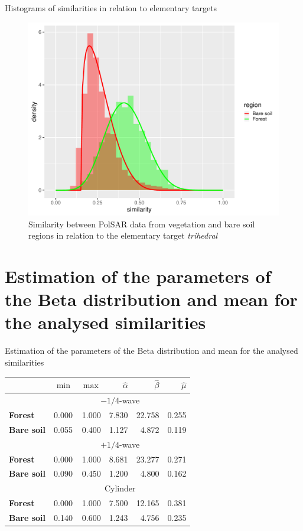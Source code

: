 \documentclass[10pt]{beamer}
\begin{document}
\begin{frame}[fragile]{Histograms of similarities in relation to elementary targets}

\begin{figure}
    \centering
    \includegraphics[width = .6\linewidth]{tr.pdf}
    \caption{Similarity between PolSAR data from vegetation and bare soil regions in relation to the elementary target \textit{trihedral}}
    \label{fig:tr}
\end{figure}
    
\end{frame}

\section[Estimation parameters]{Estimation of the parameters of the Beta distribution and mean for the analysed similarities}

\begin{frame}[fragile]{Estimation of the parameters of the Beta distribution and mean for the analysed similarities}
    \begin{table}[hbt]
    \centering
    \begin{tabular}{lrrrrr}
    \toprule
    & $\min$ & $\max$ & $\widehat\alpha$ & $\widehat\beta$ & $\widehat\mu$\\ \midrule
    & \multicolumn{5}{c}{$-1/4$-wave}\\
    \cmidrule(lr){2-6}
    \textbf{Forest} & 0.000 & 1.000 & 7.830 & 22.758 & 0.255\\
    \textbf{Bare soil} & 0.055 & 0.400 & 1.127 & 4.872 & 0.119\\
    \midrule
    & \multicolumn{5}{c}{$+1/4$-wave}\\
    \cmidrule(lr){2-6}
    \textbf{Forest} & 0.000 & 1.000 & 8.681 & 23.277 & 0.271\\
    \textbf{Bare soil} & 0.090 & 0.450 & 1.200 & 4.800 & 0.162\\
    \midrule
    & \multicolumn{5}{c}{Cylinder}\\
    \cmidrule(lr){2-6}
    \textbf{Forest} & 0.000 & 1.000 & 7.500 & 12.165 & 0.381\\
    \textbf{Bare soil} & 0.140 & 0.600 & 1.243 & 4.756 & 0.235\\
    \bottomrule
    \end{tabular}
    \end{table}
\end{frame}
\end{document}
